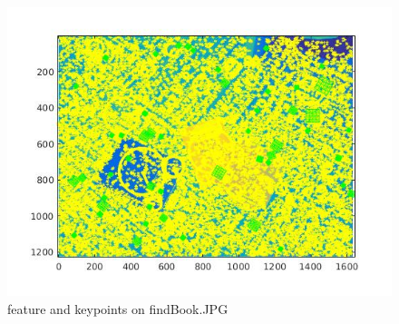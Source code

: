 \documentclass[]{article}
\begin{document}
\begin{figure}[h!]
\centering
\includegraphics[width=1.35\textwidth]{img/2a2.jpg}
\caption{feature and keypoints on findBook.JPG}
\end{figure}
\end{document}
